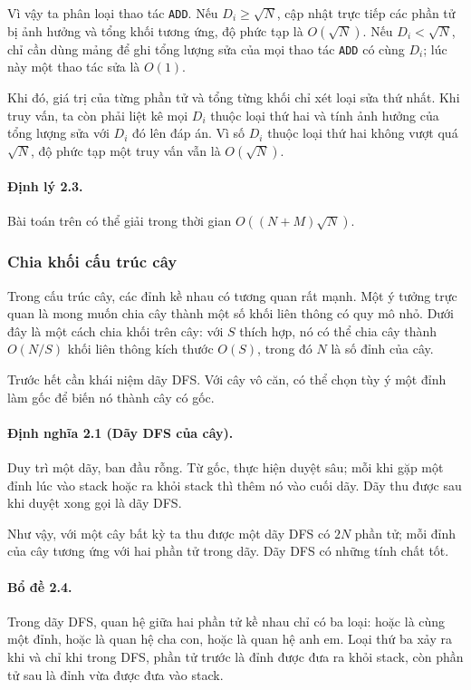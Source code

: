 \documentclass[11pt]{article}
\begin{document}
Vì vậy ta phân loại thao tác \texttt{ADD}. Nếu \(D_i\ge\sqrt N\), cập nhật
trực tiếp các phần tử bị ảnh hưởng và tổng khối tương ứng, độ phức tạp là
\(O(\sqrt N)\). Nếu \(D_i<\sqrt N\), chỉ cần dùng mảng để ghi tổng lượng sửa
của mọi thao tác \texttt{ADD} có cùng \(D_i\); lúc này một thao tác sửa là
\(O(1)\).

Khi đó, giá trị của từng phần tử và tổng từng khối chỉ xét loại sửa thứ nhất.
Khi truy vấn, ta còn phải liệt kê mọi \(D_i\) thuộc loại thứ hai và tính ảnh
hưởng của tổng lượng sửa với \(D_i\) đó lên đáp án. Vì số \(D_i\) thuộc loại
thứ hai không vượt quá \(\sqrt N\), độ phức tạp một truy vấn vẫn là
\(O(\sqrt N)\).

\paragraph{Định lý 2.3.}
Bài toán trên có thể giải trong thời gian \(O((N+M)\sqrt N)\).

\subsubsection{Chia khối cấu trúc cây}

Trong cấu trúc cây, các đỉnh kề nhau có tương quan rất mạnh. Một ý tưởng trực
quan là mong muốn chia cây thành một số khối liên thông có quy mô nhỏ. Dưới
đây là một cách chia khối trên cây: với \(S\) thích hợp, nó có thể chia cây
thành \(O(N/S)\) khối liên thông kích thước \(O(S)\), trong đó \(N\) là số
đỉnh của cây.

Trước hết cần khái niệm dãy DFS. Với cây vô căn, có thể chọn tùy ý một đỉnh
làm gốc để biến nó thành cây có gốc.

\paragraph{Định nghĩa 2.1 (Dãy DFS của cây).}
Duy trì một dãy, ban đầu rỗng. Từ gốc, thực hiện duyệt sâu; mỗi khi gặp một
đỉnh lúc vào stack hoặc ra khỏi stack thì thêm nó vào cuối dãy. Dãy thu được
sau khi duyệt xong gọi là dãy DFS.

Như vậy, với một cây bất kỳ ta thu được một dãy DFS có \(2N\) phần tử; mỗi
đỉnh của cây tương ứng với hai phần tử trong dãy. Dãy DFS có những tính chất
tốt.

\paragraph{Bổ đề 2.4.}
Trong dãy DFS, quan hệ giữa hai phần tử kề nhau chỉ có ba loại: hoặc là cùng
một đỉnh, hoặc là quan hệ cha con, hoặc là quan hệ anh em. Loại thứ ba xảy ra
khi và chỉ khi trong DFS, phần tử trước là đỉnh được đưa ra khỏi stack, còn
phần tử sau là đỉnh vừa được đưa vào stack.
\end{document}
